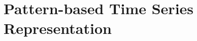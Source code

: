 \documentclass[
	a4paper,
	twoside,	%
	openright,  %
	chapterprefix=false,
	11pt,
	headings=big,
	draft=false,
	oldfontcommands]{memoir}
\def\TikzLocation{../tikz/}
\def\crossref{}
\begin{document}
\def\biblio{}
\def\cbiblio{}
\def\crossref{}
\def\TikzLocation{./tikz/}


\setcounter{chapter}{2}

\part{Pattern-based Time Series Representation}
\label{part1}


\introPart{}












%
\end{document}
